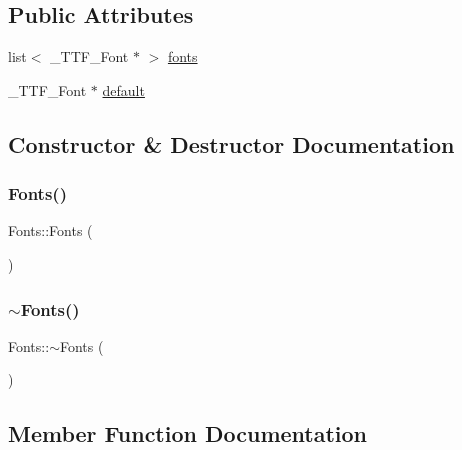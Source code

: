 \subsection*{Public Attributes}
\begin{DoxyCompactItemize}
\item 
list$<$ \+\_\+\+T\+T\+F\+\_\+\+Font $\ast$ $>$ \mbox{\hyperlink{class_fonts_a6384a64519f8c48889c8c1e00ca502d5}{fonts}}
\item 
\+\_\+\+T\+T\+F\+\_\+\+Font $\ast$ \mbox{\hyperlink{class_fonts_a8bc38464637e59ffe0e57b8f7c8c39ca}{default}}
\end{DoxyCompactItemize}


\subsection{Constructor \& Destructor Documentation}
\mbox{\label{class_fonts_a45eefc38057ad57973216627645d60c9}} 
\subsubsection{\texorpdfstring{Fonts()}{Fonts()}}
{\footnotesize\ttfamily Fonts\+::\+Fonts (\begin{DoxyParamCaption}{ }\end{DoxyParamCaption})}

\mbox{\label{class_fonts_ac49e1c3974a649f120cfb46feb221d33}} 
\subsubsection{\texorpdfstring{$\sim$Fonts()}{~Fonts()}}
{\footnotesize\ttfamily Fonts\+::$\sim$\+Fonts (\begin{DoxyParamCaption}{ }\end{DoxyParamCaption})\hspace{0.3cm}{\ttfamily [virtual]}}



\subsection{Member Function Documentation}
\mbox{\label{class_fonts_aee8000727dca2b84dc46dacc35a9667b}} 
